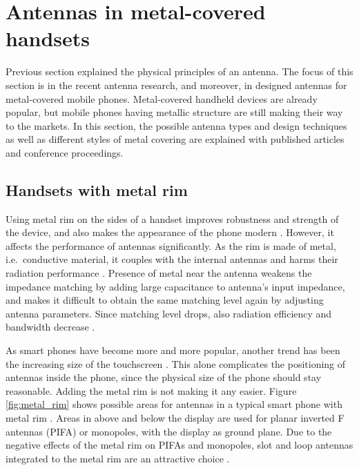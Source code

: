 \section{Antennas in metal-covered handsets}
\label{sec:metal_cover}
Previous section explained the physical principles of an antenna. The focus of this section is in the recent antenna research, and moreover, in designed antennas for metal-covered mobile phones. Metal-covered handheld devices are already popular, but mobile phones having metallic structure are still making their way to the markets. In this section, the possible antenna types and design techniques as well as different styles of metal covering are explained with published articles and conference proceedings. 

\subsection{Handsets with metal rim}
\label{sec:metal_rim}
Using metal rim on the sides of a handset improves robustness and strength of the device, and also makes the appearance of the phone modern \cite{ban_dual_loop, hsu_compact, yuan_slot}. However, it affects the performance of antennas significantly. As the rim is made of metal, i.e.\ conductive material, it couples with the internal antennas and harms their radiation performance \cite{ban_dual_loop}. Presence of metal near the antenna weakens the impedance matching by adding large capacitance to antenna's input impedance, and makes it difficult to obtain the same matching level again by adjusting antenna parameters. Since matching level drops, also radiation efficiency and bandwidth decrease \cite{ban_dual_loop, hsu_compact, yuan_slot}.

As smart phones have become more and more popular, another trend has been the increasing size of the touchscreen \cite{ban_low_profile}. This alone complicates the positioning of antennas inside the phone, since the physical size of the phone should stay reasonable. Adding the metal rim is not making it any easier. Figure \ref{fig:metal_rim} shows possible areas for antennas in a typical smart phone with metal rim \cite{hsu_compact}. Areas in above and below the display are used for planar inverted F antennas (PIFA) or monopoles, with the display as ground plane. Due to the negative effects of the metal rim on PIFAs and monopoles, slot and loop antennas integrated to the metal rim are an attractive choice \cite{hsu_compact, ban_dual_loop}.

